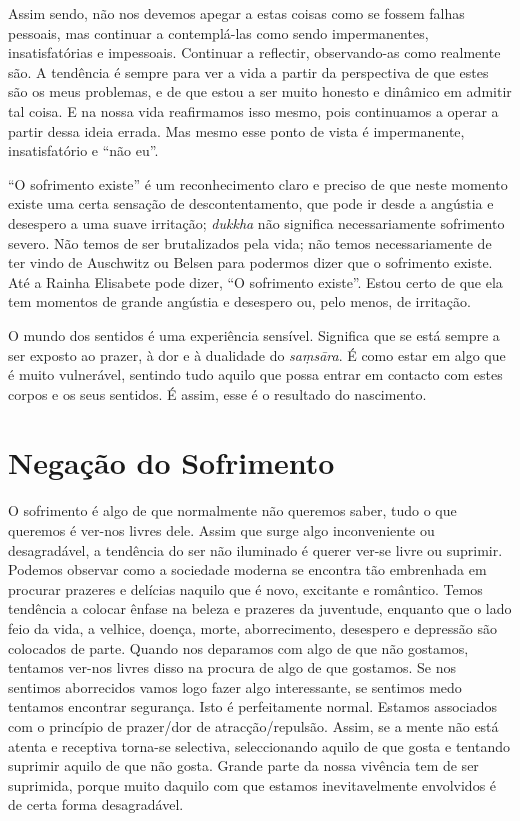 Assim sendo, não nos devemos apegar a estas coisas como se fossem falhas
pessoais, mas continuar a contemplá-las como sendo impermanentes,
insatisfatórias e impessoais. Continuar a reflectir, observando-as como
realmente são. A tendência é sempre para ver a vida a partir da perspectiva de
que estes são os meus problemas, e de que estou a ser muito honesto e dinâmico
em admitir tal coisa. E na nossa vida reafirmamos isso mesmo, pois continuamos a
operar a partir dessa ideia errada. Mas mesmo esse ponto de vista é
impermanente, insatisfatório e “não eu”.

“O sofrimento existe” é um reconhecimento claro e preciso de que neste momento
existe uma certa sensação de descontentamento, que pode ir desde a angústia e
desespero a uma suave irritação; \emph{dukkha} não significa necessariamente
sofrimento severo. Não temos de ser brutalizados pela vida; não temos
necessariamente de ter vindo de Auschwitz ou Belsen para podermos dizer que o
sofrimento existe. Até a Rainha Elisabete pode dizer, “O sofrimento existe”.
Estou certo de que ela tem momentos de grande angústia e desespero ou, pelo
menos, de irritação.

O mundo dos sentidos é uma experiência sensível. Significa que se está sempre a
ser exposto ao prazer, à dor e à dualidade do \emph{saṃsāra}. É como estar em
algo que é muito vulnerável, sentindo tudo aquilo que possa entrar em contacto
com estes corpos e os seus sentidos. É assim, esse é o resultado do nascimento.

\section{Negação do Sofrimento}

O sofrimento é algo de que normalmente não queremos saber, tudo o que queremos é
ver-nos livres dele. Assim que surge algo inconveniente ou desagradável, a
tendência do ser não iluminado é querer ver-se livre ou suprimir. Podemos
observar como a sociedade moderna se encontra tão embrenhada em procurar
prazeres e delícias naquilo que é novo, excitante e romântico. Temos tendência a
colocar ênfase na beleza e prazeres da juventude, enquanto que o lado feio da
vida, a velhice, doença, morte, aborrecimento, desespero e depressão são
colocados de parte. Quando nos deparamos com algo de que não gostamos, tentamos
ver-nos livres disso na procura de algo de que gostamos. Se nos sentimos
aborrecidos vamos logo fazer algo interessante, se sentimos medo tentamos
encontrar segurança. Isto é perfeitamente normal. Estamos associados com o
princípio de prazer/dor de atracção/repulsão. Assim, se a mente não está atenta
e receptiva torna-se selectiva, seleccionando aquilo de que gosta e tentando
suprimir aquilo de que não gosta. Grande parte da nossa vivência tem de ser
suprimida, porque muito daquilo com que estamos inevitavelmente envolvidos é de
certa forma desagradável.

